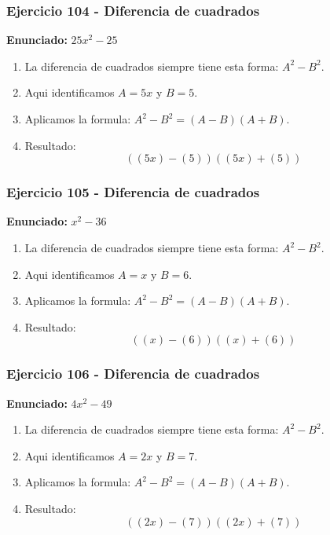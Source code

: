 \documentclass[11pt,a4paper]{article}
\begin{document}
\vspace{0.2cm}
\subsubsection*{Ejercicio 104 - Diferencia de cuadrados}
\textbf{Enunciado:} $ 25 x^{2} - 25 $\par
\begin{enumerate}[leftmargin=2em]
\item La diferencia de cuadrados siempre tiene esta forma: \(A^2-B^2\).
\item Aqui identificamos \(A=5 x\) y \(B=5\).
\item Aplicamos la formula: \(A^2-B^2=(A-B)(A+B)\).
\item Resultado: \[\boxed{\left(\left(5 x\right)-\left(5\right)\right)\left(\left(5 x\right)+\left(5\right)\right)}\]
\end{enumerate}

\vspace{0.2cm}
\subsubsection*{Ejercicio 105 - Diferencia de cuadrados}
\textbf{Enunciado:} $ x^{2} - 36 $\par
\begin{enumerate}[leftmargin=2em]
\item La diferencia de cuadrados siempre tiene esta forma: \(A^2-B^2\).
\item Aqui identificamos \(A=x\) y \(B=6\).
\item Aplicamos la formula: \(A^2-B^2=(A-B)(A+B)\).
\item Resultado: \[\boxed{\left(\left(x\right)-\left(6\right)\right)\left(\left(x\right)+\left(6\right)\right)}\]
\end{enumerate}

\vspace{0.2cm}
\subsubsection*{Ejercicio 106 - Diferencia de cuadrados}
\textbf{Enunciado:} $ 4 x^{2} - 49 $\par
\begin{enumerate}[leftmargin=2em]
\item La diferencia de cuadrados siempre tiene esta forma: \(A^2-B^2\).
\item Aqui identificamos \(A=2 x\) y \(B=7\).
\item Aplicamos la formula: \(A^2-B^2=(A-B)(A+B)\).
\item Resultado: \[\boxed{\left(\left(2 x\right)-\left(7\right)\right)\left(\left(2 x\right)+\left(7\right)\right)}\]
\end{enumerate}
\end{document}
